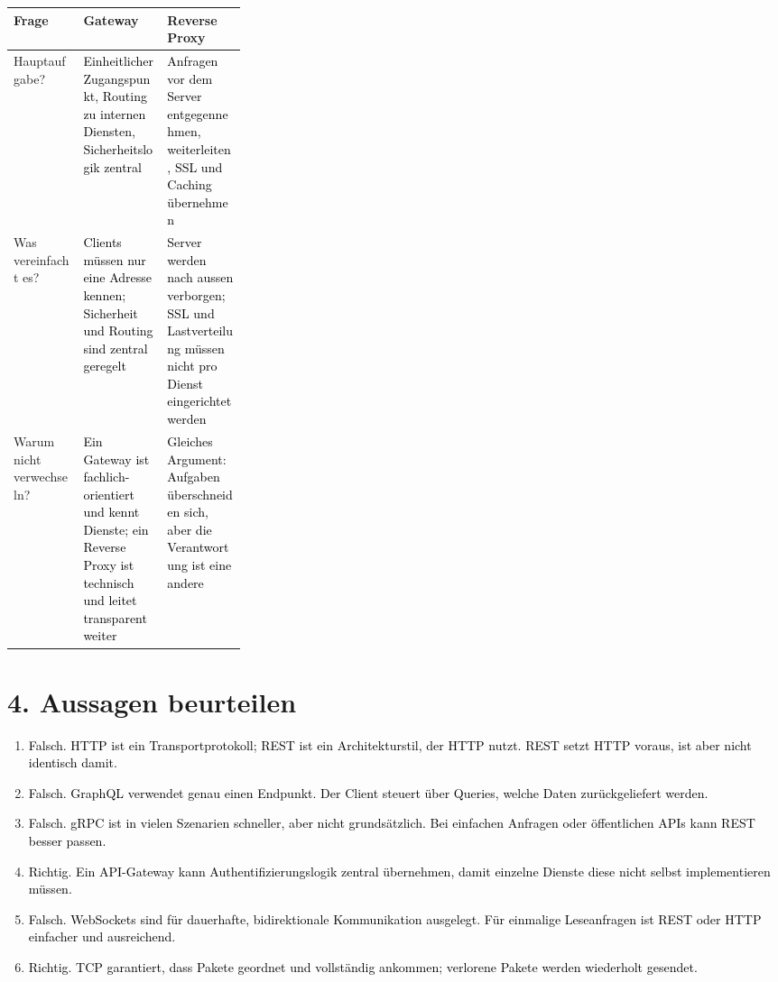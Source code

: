 \documentclass[11pt,a4paper]{article}
\newcommand{\solution}[1]{\textcolor{black}{#1}}
\begin{document}
\begin{tabularx}{\linewidth}{|>{\raggedright\arraybackslash}p{0.30\linewidth}|>{\raggedright\arraybackslash}X|>{\raggedright\arraybackslash}X|}
\hline
\textbf{Frage} & \textbf{Gateway} & \textbf{Reverse Proxy} \\
\hline
Hauptaufgabe? & \solution{Einheitlicher Zugangspunkt, Routing zu internen Diensten, Sicherheitslogik zentral} & \solution{Anfragen vor dem Server entgegennehmen, weiterleiten, SSL und Caching übernehmen} \\ \hline
Was vereinfacht es? & \solution{Clients müssen nur eine Adresse kennen; Sicherheit und Routing sind zentral geregelt} & \solution{Server werden nach aussen verborgen; SSL und Lastverteilung müssen nicht pro Dienst eingerichtet werden} \\ \hline
Warum nicht verwechseln? & \solution{Ein Gateway ist fachlich-orientiert und kennt Dienste; ein Reverse Proxy ist technisch und leitet transparent weiter} & \solution{Gleiches Argument: Aufgaben überschneiden sich, aber die Verantwortung ist eine andere} \\ \hline
\end{tabularx}

\section*{4. Aussagen beurteilen}
\begin{enumerate}
  \item \solution{Falsch. HTTP ist ein Transportprotokoll; REST ist ein Architekturstil, der HTTP nutzt. REST setzt HTTP voraus, ist aber nicht identisch damit.}
  \item \solution{Falsch. GraphQL verwendet genau einen Endpunkt. Der Client steuert über Queries, welche Daten zurückgeliefert werden.}
  \item \solution{Falsch. gRPC ist in vielen Szenarien schneller, aber nicht grundsätzlich. Bei einfachen Anfragen oder öffentlichen APIs kann REST besser passen.}
  \item \solution{Richtig. Ein API-Gateway kann Authentifizierungslogik zentral übernehmen, damit einzelne Dienste diese nicht selbst implementieren müssen.}
  \item \solution{Falsch. WebSockets sind für dauerhafte, bidirektionale Kommunikation ausgelegt. Für einmalige Leseanfragen ist REST oder HTTP einfacher und ausreichend.}
  \item \solution{Richtig. TCP garantiert, dass Pakete geordnet und vollständig ankommen; verlorene Pakete werden wiederholt gesendet.}
\end{enumerate}
\end{document}
